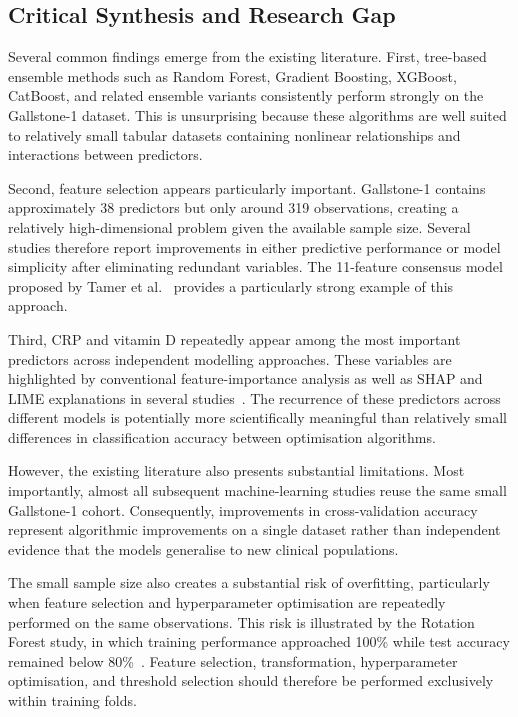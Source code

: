 \subsection{Critical Synthesis and Research Gap}

Several common findings emerge from the existing literature. First, tree-based ensemble methods such as Random Forest, Gradient Boosting, XGBoost, CatBoost, and related ensemble variants consistently perform strongly on the Gallstone-1 dataset. This is unsurprising because these algorithms are well suited to relatively small tabular datasets containing nonlinear relationships and interactions between predictors.

Second, feature selection appears particularly important. Gallstone-1 contains approximately 38 predictors but only around 319 observations, creating a relatively high-dimensional problem given the available sample size. Several studies therefore report improvements in either predictive performance or model simplicity after eliminating redundant variables. The 11-feature consensus model proposed by Tamer et al.~\cite{tamer2026novel} provides a particularly strong example of this approach.

Third, CRP and vitamin D repeatedly appear among the most important predictors across independent modelling approaches. These variables are highlighted by conventional feature-importance analysis as well as SHAP and LIME explanations in several studies~\cite{esen2024early,shrestha2026metaheuristic,das2026sloa,indirani2026ensemble}. The recurrence of these predictors across different models is potentially more scientifically meaningful than relatively small differences in classification accuracy between optimisation algorithms.

However, the existing literature also presents substantial limitations. Most importantly, almost all subsequent machine-learning studies reuse the same small Gallstone-1 cohort. Consequently, improvements in cross-validation accuracy represent algorithmic improvements on a single dataset rather than independent evidence that the models generalise to new clinical populations.

The small sample size also creates a substantial risk of overfitting, particularly when feature selection and hyperparameter optimisation are repeatedly performed on the same observations. This risk is illustrated by the Rotation Forest study, in which training performance approached 100\% while test accuracy remained below 80\%~\cite{shrestha2026metaheuristic}. Feature selection, transformation, hyperparameter optimisation, and threshold selection should therefore be performed exclusively within training folds.

